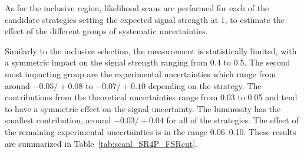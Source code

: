 \label{sec:unblinded_4L_FSRcut}

As for the inclusive region, likelihood scans are performed for each of the candidate strategies
setting the expected signal strength at 1,
to estimate the effect of the different groups of systematic uncertainties.

Similarly to the inclusive selection, the measurement is statistically limited,
with a symmetric impact on the signal strength ranging from 0.4 to 0.5.
The second most impacting group are the experimental uncertainties
which range from around ${-}0.05/{+}0.08$ to ${-}0.07/{+}0.10$ depending on the strategy.
The contributions from the theoretical uncertainties range from 0.03 to 0.05 and tend to have a symmetric effect on the signal uncertainty.
The luminosity has the smallest contribution, around ${-}0.03/{+}0.04$ for all of the strategies.
The effect of the remaining experimental uncertainties is in the range 0.06--0.10.
These results are summarized in Table~\ref{tab:scanl_SR4P_FSRcut}.

